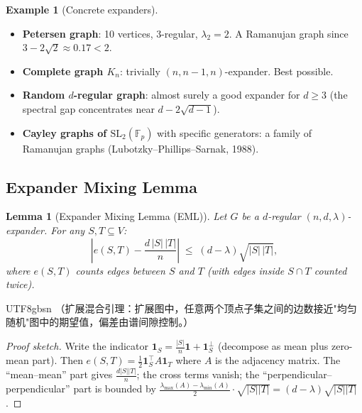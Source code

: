 \documentclass[12pt]{article}
\newtheorem{lemma}[theorem]{Lemma}
\theoremstyle{definition}
\newtheorem{example}[theorem]{Example}
\theoremstyle{remark}
\begin{document}
\begin{example}[Concrete expanders]
\begin{itemize}
  \item \textbf{Petersen graph}: 10 vertices, 3-regular, $\lambda_2 = 2$.
        A Ramanujan graph since $3 - 2\sqrt{2} \approx 0.17 < 2$.
  \item \textbf{Complete graph $K_n$}: trivially $(n, n-1, n)$-expander. Best possible.
  \item \textbf{Random $d$-regular graph}: almost surely a good expander for $d \ge 3$
        (the spectral gap concentrates near $d - 2\sqrt{d-1}$).
  \item \textbf{Cayley graphs of $\mathrm{SL}_2(\mathbb{F}_p)$} with specific generators:
        a family of Ramanujan graphs (Lubotzky--Phillips--Sarnak, 1988).
\end{itemize}
\end{example}

\subsection{Expander Mixing Lemma}

\begin{lemma}[Expander Mixing Lemma (EML)]
Let $G$ be a $d$-regular $(n,d,\lambda)$-expander.
For any $S, T \subseteq V$:
\[
  \left|e(S,T) - \frac{d\,|S|\,|T|}{n}\right| \;\le\; (d-\lambda)\sqrt{|S|\,|T|},
\]
where $e(S,T)$ counts edges between $S$ and $T$ (with edges inside $S \cap T$ counted twice).
\end{lemma}

\begin{CJK}{UTF8}{gbsn}
（扩展混合引理：扩展图中，任意两个顶点子集之间的边数接近"均匀随机"图中的期望值，偏差由谱间隙控制。）
\end{CJK}

\begin{proof}[Proof sketch]
Write the indicator $\mathbf{1}_S = \frac{|S|}{n}\mathbf{1} + \mathbf{1}_S^\perp$ (decompose as
mean plus zero-mean part).  Then $e(S,T) = \frac{1}{2}\mathbf{1}_S^\top A \mathbf{1}_T$
where $A$ is the adjacency matrix.  The ``mean--mean'' part gives $\frac{d|S||T|}{n}$;
the cross terms vanish; the ``perpendicular--perpendicular'' part is bounded by
$\frac{\lambda_{\max}(A) - \lambda_{\min}(A)}{2} \cdot \sqrt{|S||T|} = (d-\lambda)\sqrt{|S||T|}$.
\end{proof}
\end{document}
